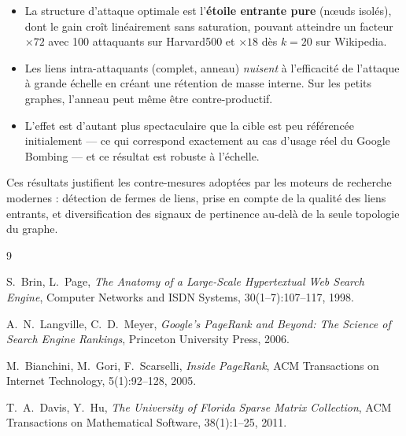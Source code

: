 \documentclass[12pt,a4paper]{article}
\theoremstyle{definition}
\begin{document}
\begin{itemize}
  \item La structure d'attaque optimale est l'\textbf{\'{e}toile entrante pure}
    (n\oe{}uds isol\'{e}s), dont le gain cro\^{i}t lin\'{e}airement sans saturation,
    pouvant atteindre un facteur $\times 72$ avec 100 attaquants sur Harvard500
    et $\times 18$ d\`{e}s $k=20$ sur Wikipedia.

  \item Les liens intra-attaquants (complet, anneau) \emph{nuisent} \`{a}
    l'efficacit\'{e} de l'attaque \`{a} grande \'{e}chelle en cr\'{e}ant une r\'{e}tention
    de masse interne. Sur les petits graphes, l'anneau peut m\^{e}me \^{e}tre
    contre-productif.

  \item L'effet est d'autant plus spectaculaire que la cible est peu
    r\'{e}f\'{e}renc\'{e}e initialement --- ce qui correspond exactement au cas d'usage
    r\'{e}el du Google Bombing --- et ce r\'{e}sultat est robuste \`{a} l'\'{e}chelle.
\end{itemize}

Ces r\'{e}sultats justifient les contre-mesures adopt\'{e}es par les moteurs de
recherche modernes : d\'{e}tection de fermes de liens, prise en compte de la
qualit\'{e} des liens entrants, et diversification des signaux de pertinence
au-del\`{a} de la seule topologie du graphe.

\begin{thebibliography}{9}

  S.~Brin, L.~Page,
  \textit{The Anatomy of a Large-Scale Hypertextual Web Search Engine},
  Computer Networks and ISDN Systems, 30(1--7):107--117, 1998.

  A.~N.~Langville, C.~D.~Meyer,
  \textit{Google's PageRank and Beyond: The Science of Search Engine Rankings},
  Princeton University Press, 2006.

  M.~Bianchini, M.~Gori, F.~Scarselli,
  \textit{Inside PageRank},
  ACM Transactions on Internet Technology, 5(1):92--128, 2005.

  T.~A.~Davis, Y.~Hu,
  \textit{The University of Florida Sparse Matrix Collection},
  ACM Transactions on Mathematical Software, 38(1):1--25, 2011.

\end{thebibliography}
\end{document}
